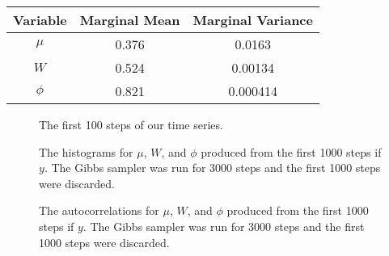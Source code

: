 \documentclass{article}
\begin{document}
\begin{center}
\begin{tabular}{c | c | c}
Variable & Marginal Mean & Marginal Variance \\
\hline
$\mu$ & 0.376 & 0.0163 \\
$W$ & 0.524 & 0.00134 \\
$\phi$ & 0.821 & 0.000414 \\
\end{tabular}
\end{center}

\begin{figure}[!h]
\begin{center}
\end{center}
\caption{The first 100 steps of our time series.}
\end{figure}

\begin{figure}[!h]
\begin{center}
\end{center}
\label{DLM2:histograms}
\caption{The histograms for $\mu$, $W$, and $\phi$ produced from the first 1000 steps if $y$.  The Gibbs sampler was run for 3000 steps and the first 1000 steps were discarded.}
\end{figure}

\begin{figure}[!h]
\begin{center}
\end{center}
\caption{The autocorrelations for $\mu$, $W$, and $\phi$ produced from the first 1000 steps if $y$.  The Gibbs sampler was run for 3000 steps and the first 1000 steps were discarded.}
\end{figure}
\end{document}
